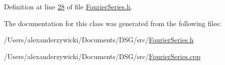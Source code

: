 Definition at line \hyperlink{_fourier_series_8h_source_l00028}{28} of file \hyperlink{_fourier_series_8h_source}{Fourier\+Series.\+h}.



The documentation for this class was generated from the following files\+:\begin{DoxyCompactItemize}
\item 
/\+Users/alexanderzywicki/\+Documents/\+D\+S\+G/src/\hyperlink{_fourier_series_8h}{Fourier\+Series.\+h}\item 
/\+Users/alexanderzywicki/\+Documents/\+D\+S\+G/src/\hyperlink{_fourier_series_8cpp}{Fourier\+Series.\+cpp}\end{DoxyCompactItemize}
